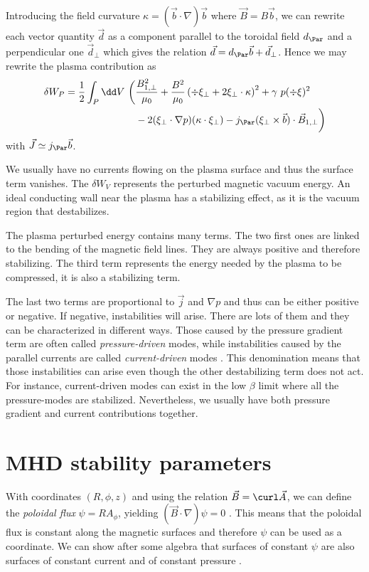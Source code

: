 Introducing the field curvature $\kappa = ( \vec{b} \cdot \nabla ) \vec{b}$ where $\vec{B} = B \vec{b}$, we can rewrite each vector quantity $\vec{d}$ as a component parallel to the toroidal field $d_{\Par}$ and a perpendicular one $\vec{d}_{\perp}$ which gives the relation $\vec{d} = d_{\Par} \vec{b} + \vec{d}_{\perp}$. Hence we may rewrite the plasma contribution as \cite{boyd-sanderson}
\begin{align}\nonumber
	\delta W_P = \frac{1}{2} \int_{P} \dd V\ \bigg( & \frac{B_{1,\perp}^2}{\mu_0} + \frac{B^2}{\mu_0} \left( \div \xi_{\perp} + 2 \xi_{\perp} \cdot \kappa \right)^2 + \gamma\ p (\div \xi)^2\\
												    & - 2 ( \xi_{\perp} \cdot \nabla p ) ( \kappa \cdot \xi_{\perp} ) - j_{\Par} ( \xi_{\perp} \times \vec{b} ) \cdot \vec{B}_{1,\perp} \bigg)
	\label{eq:MHD:deltaWP2}
\end{align}
with $\vec{J} \simeq j_{\Par} \vec{b}$.

We usually have no currents flowing on the plasma surface and thus the surface term vanishes. The $\delta W_V$ represents the perturbed magnetic vacuum energy. An ideal conducting wall near the plasma has a stabilizing effect, as it is the vacuum region that destabilizes.

The plasma perturbed energy contains many terms. The two first ones are linked to the bending of the magnetic field lines. They are always positive and therefore stabilizing. The third term represents the energy needed by the plasma to be compressed, it is also a stabilizing term.

The last two terms are proportional to $\vec{j}$ and $\nabla p$ and thus can be either positive or negative. If negative, instabilities will arise. There are lots of them and they can be characterized in different ways. Those caused by the pressure gradient term are often called \emph{pressure-driven} modes, while instabilities caused by the parallel currents are called \emph{current-driven} modes \cite{boyd-sanderson,freidberg}. This denomination means that those instabilities can arise even though the other destabilizing term does not act. For instance, current-driven modes can exist in the low $\beta$ limit where all the pressure-modes are stabilized. Nevertheless, we usually have both pressure gradient and current contributions together.
\section{MHD stability parameters}\label{sec:MHD:qqs}
With coordinates $(R,\phi,z)$ and using the relation $\vec{B} = \curl \vec{A}$, we can define the \emph{poloidal flux} $\psi = R A_{\phi}$, yielding $(\vec{B} \cdot \nabla) \psi = 0$ \cite{boyd-sanderson}. This means that the poloidal flux is constant along the magnetic surfaces and therefore $\psi$ can be used as a coordinate. We can show after some algebra that surfaces of constant $\psi$ are also surfaces of constant current and of constant pressure \cite{boyd-sanderson}.

